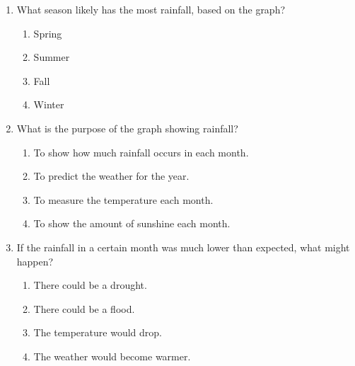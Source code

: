 \documentclass[12pt]{article}
\begin{document}
\begin{enumerate}
    \vspace{0.5cm}

    \item What season likely has the most rainfall, based on the graph?

    \begin{enumerate}[label=\Alph*.]
        \item Spring
        \item Summer
        \item Fall
        \item Winter
    \end{enumerate}

    \vspace{0.5cm}

    \item What is the purpose of the graph showing rainfall?

    \begin{enumerate}[label=\Alph*.]
        \item To show how much rainfall occurs in each month.
        \item To predict the weather for the year.
        \item To measure the temperature each month.
        \item To show the amount of sunshine each month.
    \end{enumerate}

    \vspace{0.5cm}

    \item If the rainfall in a certain month was much lower than expected, what might happen?

    \begin{enumerate}[label=\Alph*.]
        \item There could be a drought.
        \item There could be a flood.
        \item The temperature would drop.
        \item The weather would become warmer.
    \end{enumerate}

\end{enumerate}
\end{document}
